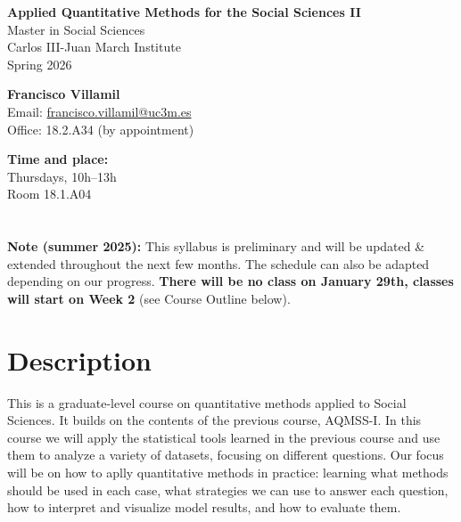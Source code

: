 \documentclass[12pt, a4paper]{article}
\begin{document}
\begin{center}
{\Large\bf Applied Quantitative Methods for the Social Sciences II}\\\vspace{10pt}
Master in Social Sciences\\Carlos III-Juan March Institute\\
\vspace{10pt}
{\large Spring 2026}\\
\end{center}

\vspace{15pt}

\begin{minipage}{0.6\textwidth}
\textbf{Francisco Villamil}\\
Email: \href{francisco.villamil@uc3m.es}{francisco.villamil@uc3m.es}\\
Office: 18.2.A34 (by appointment)
\end{minipage}\hfill
\begin{minipage}{0.39\textwidth}
\centering
\textbf{Time and place:}\\
Thursdays, 10h--13h\\Room 18.1.A04
\end{minipage}


\section*{}

\textbf{Note (summer 2025):} This syllabus is preliminary and will be updated \& extended throughout the next few months. The schedule can also be adapted depending on our progress. \textbf{There will be no class on January 29th, classes will start on Week 2} (see Course Outline below).

\section{Description}

This is a graduate-level course on quantitative methods applied to Social Sciences. It builds on the contents of the previous course, AQMSS-I. In this course we will apply the statistical tools learned in the previous course and use them to analyze a variety of datasets, focusing on different questions. Our focus will be on how to aplly quantitative methods in practice: learning what methods should be used in each case, what strategies we can use to answer each question, how to interpret and visualize model results, and how to evaluate them.
\end{document}
